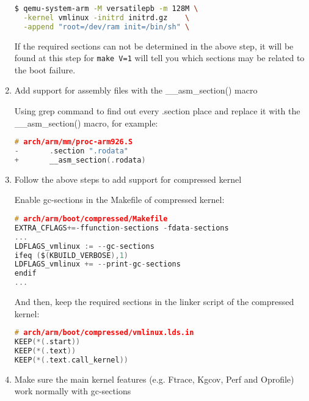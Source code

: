 \documentclass[10pt,a4paper]{article}
\begin{document}
\begin{multicols}{2}
\begin{enumerate}
\begin{lstlisting}[language=bash,
                  commentstyle=\fontsize{7}{8}\selectfont,
                  basicstyle=\ttfamily\fontsize{7}{8}\selectfont]
$ qemu-system-arm -M versatilepb -m 128M \
  -kernel vmlinux -initrd initrd.gz    \
  -append "root=/dev/ram init=/bin/sh" \
\end{lstlisting}

If the required sections can not be determined in the above step, it will be
found at this step for {\small {\tt make V=1}} will tell you which sections may
be related to the boot failure.

\item Add support for assembly files with the \_\_asm\_section() macro

Using grep command to find out every .section place and replace it with the
\_\_asm\_section() macro, for example:

\begin{lstlisting}[language=c,
                  commentstyle=\fontsize{7}{8}\selectfont,
                  basicstyle=\ttfamily\fontsize{7}{8}\selectfont]
# arch/arm/mm/proc-arm926.S
-       .section ".rodata"
+       __asm_section(.rodata)
\end{lstlisting}

\item Follow the above steps to add support for compressed kernel

Enable gc-sections in the Makefile of compressed kernel:

\begin{lstlisting}[language=c,
                  commentstyle=\fontsize{7}{8}\selectfont,
                  basicstyle=\ttfamily\fontsize{7}{8}\selectfont]
# arch/arm/boot/compressed/Makefile
EXTRA_CFLAGS+=-ffunction-sections -fdata-sections
...
LDFLAGS_vmlinux := --gc-sections
ifeq ($(KBUILD_VERBOSE),1)
LDFLAGS_vmlinux += --print-gc-sections
endif
...
\end{lstlisting}

And then, keep the required sections in the linker script of the compressed
kernel:

\begin{lstlisting}[language=c,
                  commentstyle=\fontsize{7}{8}\selectfont,
                  basicstyle=\ttfamily\fontsize{7}{8}\selectfont]
# arch/arm/boot/compressed/vmlinux.lds.in
KEEP(*(.start))
KEEP(*(.text))
KEEP(*(.text.call_kernel))
\end{lstlisting}

\item Make sure the main kernel features (e.g. Ftrace, Kgcov, Perf and
Oprofile) work normally with gc-sections


\end{enumerate}
\end{multicols}
\end{document}
